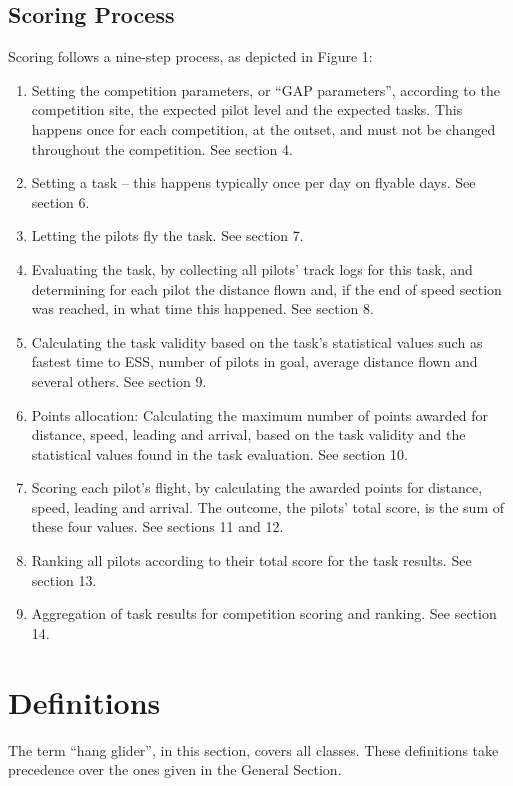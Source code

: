 \documentclass{article}
\begin{document}
\subsection{Scoring Process}
Scoring follows a nine-step process, as depicted in Figure 1:
\begin{enumerate}
    \item
        Setting the competition parameters, or “GAP parameters”, according to
        the competition site, the expected pilot level and the expected tasks.
        This happens once for each competition, at the outset, and must not be
        changed throughout the competition. See section 4.
    \item
        Setting a task – this happens typically once per day on flyable days.
        See section 6.
    \item
        Letting the pilots fly the task. See section 7.
    \item
        Evaluating the task, by collecting all pilots’ track logs for this
        task, and determining for each pilot the distance flown and, if the end
        of speed section was reached, in what time this happened. See section
        8.
    \item
        Calculating the task validity based on the task’s statistical values
        such as fastest time to ESS, number of pilots in goal, average distance
        flown and several others. See section 9.
    \item
        Points allocation: Calculating the maximum number of points awarded for
        distance, speed, leading and arrival, based on the task validity and
        the statistical values found in the task evaluation. See section 10.
    \item
        Scoring each pilot’s flight, by calculating the awarded points for
        distance, speed, leading and arrival. The outcome, the pilots’ total
        score, is the sum of these four values. See sections 11 and 12.
    \item
        Ranking all pilots according to their total score for the task results.
        See section 13.
    \item
        Aggregation of task results for competition scoring and ranking. See
        section 14.
\end{enumerate}

\newpage
\section{Definitions}
The term “hang glider”, in this section, covers all classes. These definitions
take precedence over the ones given in the General Section.
\end{document}
